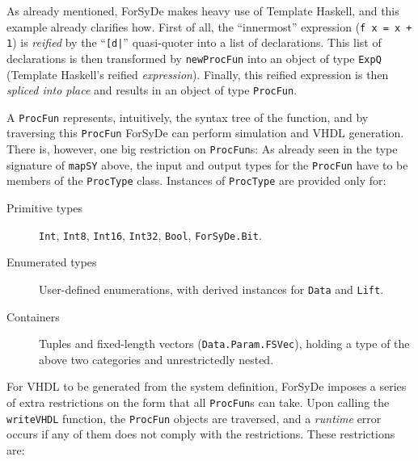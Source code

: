 
            As already mentioned, ForSyDe makes heavy use of Template Haskell, and this example
            already clarifies how. First of all, the ``innermost'' expression (\verb;f x = x + 1;)
            is \emph{reified} by the ``\texttt{[d|}'' quasi-quoter into a list of declarations. This
            list of declarations is then transformed by \texttt{newProcFun} into an object of type
            \texttt{ExpQ} (Template Haskell's reified \emph{expression}). Finally, this reified
            expression is then \emph{spliced into place} and results in an object of type
            \texttt{ProcFun}.

            A \texttt{ProcFun} represents, intuitively, the syntax tree of the function, and by
            traversing this \texttt{ProcFun} ForSyDe can perform simulation and VHDL generation.
            There is, however, one big restriction on \texttt{ProcFun}s: As already seen in the type
            signature of \texttt{mapSY} above, the input and output types for the \texttt{ProcFun}
            have to be members of the \texttt{ProcType} class. Instances of \texttt{ProcType} are
            provided only for:

            \begin{description}
                \item[Primitive types] \texttt{Int}, \texttt{Int8}, \texttt{Int16},
                    \texttt{Int32}, \texttt{Bool}, \texttt{ForSyDe.Bit}.

                \item[Enumerated types] User-defined enumerations, with derived instances for
                    \texttt{Data} and \texttt{Lift}.

                \item[Containers] Tuples and fixed-length vectors (\texttt{Data.Param.FSVec}),
                    holding a type of the above two categories and unrestrictedly nested.
            \end{description}

            For VHDL to be generated from the system definition, ForSyDe imposes a series of extra
            restrictions on the form that all \texttt{ProcFun}s can take. Upon calling the
            \texttt{writeVHDL} function, the \texttt{ProcFun} objects are traversed, and a
            \emph{runtime} error occurs if any of them does not comply with the restrictions.  These
            restrictions are:


